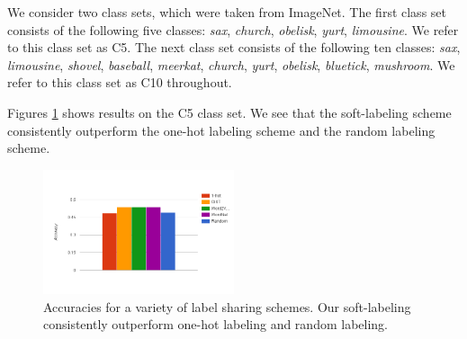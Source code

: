 

We consider two class sets, which were taken from ImageNet. The first class set
consists of the following five classes: \emph{sax}, \emph{church},
\emph{obelisk}, \emph{yurt}, \emph{limousine}. We refer to this class set as C5.
The next class set consists of the following ten classes: \emph{sax},
\emph{limousine}, \emph{shovel}, \emph{baseball}, \emph{meerkat}, \emph{church},
\emph{yurt}, \emph{obelisk}, \emph{bluetick}, \emph{mushroom}. We refer to this
class set as C10 throughout.

Figures \ref{fig:5_1-train_100} shows results on the C5 class set. We see that
the soft-labeling scheme consistently outperform the one-hot labeling scheme and
the random labeling scheme. 

\begin{figure}[!tb]
  \centering
  \includegraphics[width=0.5\textwidth]{figs/5_1-train_100.png}
  \caption{
      Accuracies for a variety of label sharing schemes. Our soft-labeling
      consistently outperform one-hot labeling and random labeling.
  }
  \label{fig:5_1-train_100}
\end{figure}

